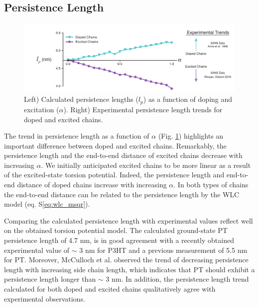 \subsection{Persistence Length}

\begin{figure}[hbt!]
    \centering
    \includegraphics{figures/chap2/persist_len.pdf}
    \caption{Left) Calculated persistence lengths ($l_p$) as a function of doping and excitation ($\alpha$). Right) Experimental persistence length trends for doped and excited chains.}
    \label{fig:lp}
\end{figure}

The trend in persistence length as a function of $\alpha$ (Fig. \ref{fig:lp}) highlights an important difference between doped and excited chains. Remarkably, the persistence length and the end-to-end distance of excited chains decrease with increasing $\alpha$. We initially anticipated excited chains to be more linear as a result of the excited-state torsion potential. Indeed, the persistence length and end-to-end distance of doped chains increase with increasing $\alpha$. In both types of chains the end-to-end distance can be related to the persistence length by the WLC model (eq. {\color{blue}S}\ref{eq:wlc_msqr}).

Comparing the calculated persistence length with experimental values reflect well on the obtained torsion potential model. The calculated ground-state PT persistence length of 4.7 nm, is in good agreement with a recently obtained experimental value of $\sim$ 3 nm for P3HT\cite{Mcculloch2013} and a previous measurement of 5.5 nm for PT.\cite{Aime1989} Moreover, McCulloch et al. observed the trend of decreasing persistence length with increasing side chain length, which indicates that PT should exhibit a persistence length longer than $\sim$ 3 nm. In addition, the persistence length trend calculated for both doped and excited chains qualitatively agree with experimental observations.

